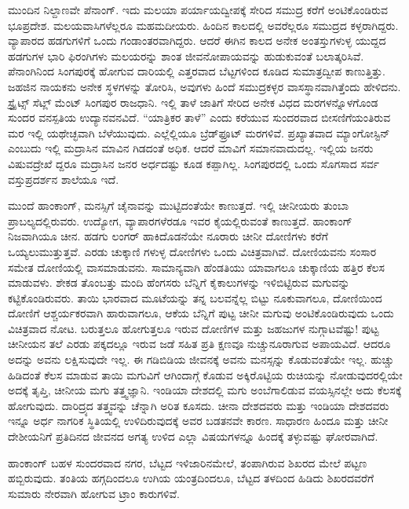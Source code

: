 ಮುಂದಿನ ನಿಲ್ದಾಣವೇ ಪೆನಾಂಗ್. ಇದು ಮಲಯಾ ಪರ್ಯಾಯದ್ವೀಪಕ್ಕೆ ಸೇರಿದ ಸಮುದ್ರ ಕರೆಗೆ ಅಂಟಿಕೊಂಡಿರುವ ಭೂಪ್ರದೇಶ. ಮಲಯವಾಸಿಗಳೆಲ್ಲರೂ ಮಹಮದೀಯರು. ಹಿಂದಿನ ಕಾಲದಲ್ಲಿ ಅವರೆಲ್ಲರೂ ಸಮುದ್ರದ ಕಳ್ಳರಾಗಿದ್ದರು. ವ್ಯಾಪಾರದ ಹಡಗುಗಳಿಗೆ ಒಂದು ಗಂಡಾಂತರವಾಗಿದ್ದರು. ಆದರೆ ಈಗಿನ ಕಾಲದ ಅನೇಕ ಅಂತಸ್ತುಗಳುಳ್ಳ ಯುದ್ದದ ಹಡಗುಗಳ ಭಾರಿ ಫಿರಂಗಿಗಳು ಮಲಯರನ್ನು ಶಾಂತ ಜೀವನೋಪಾಯವನ್ನು ಹುಡುಕುವಂತೆ ಬಲಾತ್ಕರಿಸಿವೆ. ಪೆನಾಂಗಿನಿಂದ ಸಿಂಗಪುರಕ್ಕೆ ಹೋಗುವ ದಾರಿಯಲ್ಲಿ ಎತ್ತರವಾದ ಬೆಟ್ಟಗಳಿಂದ ಕೂಡಿದ ಸುಮಾತ್ರದ್ವೀಪ ಕಾಣುತ್ತಿತ್ತು. ಜಹಜಿನ ನಾಯಕನು ಅನೇಕ ಸ್ಥಳಗಳನ್ನು ತೋರಿಸಿ, ಅವುಗಳು ಹಿಂದೆ ಸಮುದ್ರಕಳ್ಳರ ವಾಸಸ್ಥಾನವಾಗಿತ್ತೆಂದು ಹೇಳಿದನು. ಸ್ಟ್ರೈಟ್ಸ್ ಸೆಟ್ಲ್ ಮೆಂಟ್  ಸಿಂಗಪುರ ರಾಜಧಾನಿ. ಇಲ್ಲಿ ತಾಳೆ ಜಾತಿಗೆ ಸೇರಿದ ಅನೇಕ ವಿಧದ ಮರಗಳನ್ನೊಳಗೊಂಡ ಸುಂದರ ವನಸ್ಪತಿಯ ಉದ್ಯಾನವನವಿದೆ. “ಯಾತ್ರಿಕರ ತಾಳೆ” ಎಂದು ಕರೆಯುವ ಸುಂದರವಾದ ಬೀಸಣಿಗೆಯಂತಿರುವ ಮರ ಇಲ್ಲಿ ಯಥೇಚ್ಛವಾಗಿ ಬೆಳೆಯುವುದು. ಎಲ್ಲೆಲ್ಲಿಯೂ ಬ್ರೆಡ್‌ಫ್ರೂಟ್ ಮರಗಳಿವೆ. ಪ್ರಖ್ಯಾತವಾದ ಮ್ಯಾಂಗೋಸ್ಟಿನ್ ಎಂಬುದು ಇಲ್ಲಿ ಮದ್ರಾಸಿನ ಮಾವಿನ ಗಿಡದಂತೆ ಅಧಿಕ. ಆದರೆ ಮಾವಿಗೆ ಸಮಾನವಾದುದಲ್ಲ. ಇಲ್ಲಿಯ ಜನರು ವಿಷುವದ್ರೇಖೆ ದ್ದರೂ ಮದ್ರಾಸಿನ ಜನರ ಅರ್ಧದಷ್ಟು ಕೂಡ ಕಪ್ಪಾಗಿಲ್ಲ. ಸಿಂಗಪುರದಲ್ಲಿ ಒಂದು ಸೊಗಸಾದ ಸರ್ವ ವಸ್ತುಪ್ರದರ್ಶನ ಶಾಲೆಯೂ ಇದೆ.

ಮುಂದೆ ಹಾಂಕಾಂಗ್, ಮನಸ್ಸಿಗೆ ಚೈನಾವನ್ನು ಮುಟ್ಟಿದಂತೆಯೇ ಕಾಣುತ್ತದೆ. ಇಲ್ಲಿ ಚೀನೀಯರು ತುಂಬಾ ಪ್ರಾಬಲ್ಯದಲ್ಲಿರುವರು. ಉದ್ಯೋಗ, ವ್ಯಾಪಾರಗಳೆರಡೂ ಇವರ ಕೈಯಲ್ಲಿರುವಂತೆ ಕಾಣುತ್ತದೆ. ಹಾಂಕಾಂಗ್ ನಿಜವಾಗಿಯೂ ಚೀನ. ಹಡಗು ಲಂಗರ್‌ ಹಾಕಿದೊಡನೆಯೇ ನೂರಾರು ಚೀನೀ ದೋಣಿಗಳು ಕರೆಗೆ ಒಯ್ಯಲುಮುತ್ತುತ್ತವೆ. ಎರಡು ಚುಕ್ಕಾಣಿ  ಗಳುಳ್ಳ ದೋಣಿಗಳು ಒಂದು ವಿಚಿತ್ರವಾಗಿವೆ. ದೋಣಿಯವನು ಸಂಸಾರ ಸಮೇತ ದೋಣಿಯಲ್ಲಿ ವಾಸಮಾಡುವನು. ಸಾಮಾನ್ಯವಾಗಿ ಹೆಂಡತಿಯು ಯಾವಾಗಲೂ ಚುಕ್ಕಾಣಿಯ ಹತ್ತಿರ ಕೆಲಸ ಮಾಡುವಳು. ಶೇಕಡ ತೊಂಬತ್ತು ಮಂದಿ ಹೆಂಗಸರು ಬೆನ್ನಿಗೆ ಕೈಕಾಲುಗಳನ್ನು ಇಳಿಬಿಟ್ಟಿರುವ ಮಗುವನ್ನು ಕಟ್ಟಿಕೊಂಡಿರುವರು. ತಾಯಿ ಭಾರವಾದ ಮೂಟೆಯನ್ನು ತನ್ನ ಬಲವನ್ನೆಲ್ಲ ಬಿಟ್ಟು ನೂಕುವಾಗಲೂ, ದೋಣಿಯಿಂದ ದೋಣಿಗೆ ಆಶ್ಚರ್ಯಕರವಾಗಿ ಹಾರುವಾಗಲೂ, ಆಕೆಯ ಬೆನ್ನಿಗೆ ಪುಟ್ಟ ಚೀನೀ ಮಗುವು ಅಂಟಿಕೊಂಡಿರುವುದು ಒಂದು ವಿಚಿತ್ರವಾದ ನೋಟ. ಬರುತ್ತಲೂ ಹೋಗುತ್ತಲೂ ಇರುವ ದೋಣಿಗಳ ಮತ್ತು ಜಹಜುಗಳ ನುಗ್ಗಾಟವೆಷ್ಟು! ಪುಟ್ಟ ಚೀನೀಯನ ತಲೆ ಎರಡು ಪಕ್ಕದಲ್ಲೂ ಇರುವ ಜಡೆ ಸಹಿತ ಪ್ರತಿ ಕ್ಷಣವೂ ನುಚ್ಚುನೂರಾಗುವ ಅಪಾಯವಿದೆ. ಆದರೂ ಅದನ್ನು ಅವನು ಲಕ್ಷಿಸುವುದೇ ಇಲ್ಲ. ಈ ಗಡಿಬಿಡಿಯ ಜೀವನಕ್ಕೆ ಅವನು ಮನಸ್ಸನ್ನು ಕೊಡುವಂತೆಯೇ ಇಲ್ಲ. ಹುಚ್ಚು ಹಿಡಿದಂತೆ ಕೆಲಸ ಮಾಡುವ ತಾಯಿ ಮಗುವಿಗೆ ಆಗಿಂದಾಗ್ಗೆ ಕೊಡುವ ಅಕ್ಕಿರೊಟ್ಟಿಯ ರುಚಿಯನ್ನು ನೋಡುವುದರಲ್ಲಿಯೇ ಅದಕ್ಕೆ ತೃಪ್ತಿ, ಚೀನೀಯ ಮಗು ತತ್ತ್ವಜ್ಞಾನಿ. ಇಂಡಿಯಾ ದೇಶದಲ್ಲಿ ಮಗು ಅಂಬೆಗಾಲಿಡುವ ವಯಸ್ಸಿನಲ್ಲೇ ಅದು ಕೆಲಸಕ್ಕೆ ಹೋಗುವುದು. ದಾರಿದ್ರ್ಯದ ತತ್ತ್ವವನ್ನು ಚೆನ್ನಾಗಿ ಅರಿತ ಕೂಸದು. ಚೀನಾ ದೇಶದವರು ಮತ್ತು ಇಂಡಿಯಾ ದೇಶದವರು ಇನ್ನೂ ಅರ್ಧ ನಾಗರಿಕ ಸ್ಥಿತಿಯಲ್ಲಿ ಉಳಿದಿರುವುದಕ್ಕೆ ಅವರ ಬಡತನವೇ ಕಾರಣ. ಸಾಧಾರಣ ಹಿಂದೂ ಮತ್ತು ಚೀನೀ ದೇಶೀಯನಿಗೆ ಪ್ರತಿದಿನದ ಜೀವನದ ಅಗತ್ಯ ಉಳಿದ ಎಲ್ಲಾ ವಿಷಯಗಳನ್ನೂ ಹಿಂದಕ್ಕೆ ತಳ್ಳುವಷ್ಟು ಘೋರವಾಗಿದೆ.

ಹಾಂಕಾಂಗ್ ಬಹಳ ಸುಂದರವಾದ ನಗರ, ಬೆಟ್ಟದ ಇಳಿಜಾರಿನಮೇಲೆ, ತಂಪಾಗಿರುವ ಶಿಖರದ ಮೇಲೆ ಪಟ್ಟಣ ಹಬ್ಬಿರುವುದು. ತಂತಿಯ ಹಗ್ಗದಿಂದಲೂ ಉಗಿಯ ಯಂತ್ರದಿಂದಲೂ, ಬೆಟ್ಟದ ತಳದಿಂದ ಹಿಡಿದು ಶಿಖರದವರೆಗೆ ಸುಮಾರು ನೇರವಾಗಿ ಹೋಗುವ ಟ್ರಾಂ ಕಾರುಗಳಿವೆ.

